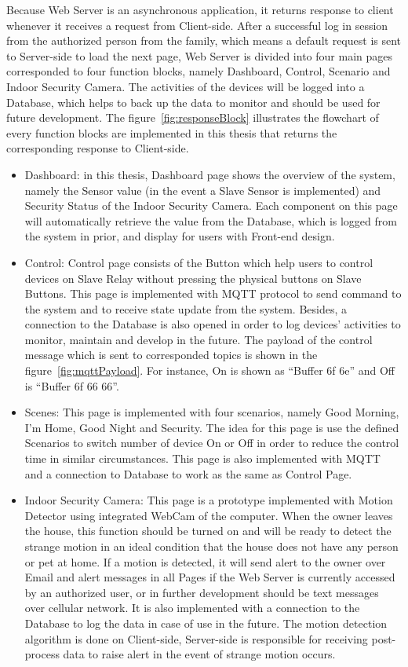         Because Web Server is an asynchronous application, it returns response to client whenever it receives a request from Client-side. After a successful log in session from the authorized person from the family, which means a default request is sent to Server-side to load the next page, Web Server is divided into four main pages corresponded to four function blocks, namely Dashboard, Control, Scenario and Indoor Security Camera. The activities of the devices will be logged into a Database, which helps to back up the data to monitor and should be used for future development. The figure~\ref{fig:responseBlock} illustrates the flowchart of every function blocks are implemented in this thesis that returns the corresponding response to Client-side.
        \begin{itemize}
            \item Dashboard: in this thesis, Dashboard page shows the overview of the system, namely the Sensor value (in the event a Slave Sensor is implemented) and Security Status of the Indoor Security Camera. Each component on this page will automatically retrieve the value from the Database, which is logged from the system in prior, and display for users with Front-end design.
            \item Control: Control page consists of the Button which help users to control devices on Slave Relay without pressing the physical buttons on Slave Buttons. This page is implemented with MQTT protocol to send command to the system and to receive state update from the system. Besides, a connection to the Database is also opened in order to log devices’ activities to monitor, maintain and develop in the future. The payload of the control message which is sent to corresponded topics is shown in the figure~\ref{fig:mqttPayload}. For instance, On is shown as “Buffer 6f 6e” and Off is “Buffer 6f 66 66”.
            \item Scenes: This page is implemented with four scenarios, namely Good Morning, I’m Home, Good Night and Security. The idea for this page is use the defined Scenarios to switch number of device On or Off in order to reduce the control time in similar circumstances. This page is also implemented with MQTT and a connection to Database to work as the same as Control Page.
            \item Indoor Security Camera: This page is a prototype implemented with Motion Detector using integrated WebCam of the computer. When the owner leaves the house, this function should be turned on and will be ready to detect the strange motion in an ideal condition that the house does not have any person or pet at home. If a motion is detected, it will send alert to the owner over Email and alert messages in all Pages if the Web Server is currently accessed by an authorized user, or in further development should be text messages over cellular network. It is also implemented with a connection to the Database to log the data in case of use in the future. The motion detection algorithm is done on Client-side, Server-side is responsible for receiving post-process data to raise alert in the event of strange motion occurs.
            \end{itemize}

